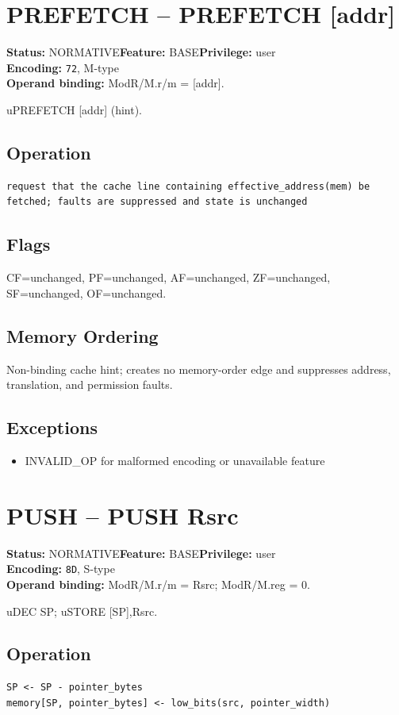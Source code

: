 \documentclass[10pt]{article}
\begin{document}
\section{PREFETCH -- PREFETCH [addr]}
\textbf{Status:} NORMATIVE\quad \textbf{Feature:} BASE\quad \textbf{Privilege:} user\\
\textbf{Encoding:} \texttt{72}, M-type\\
\textbf{Operand binding:} ModR/M.r/m = [addr].

uPREFETCH [addr] (hint).

\subsection*{Operation}
\begin{lstlisting}
request that the cache line containing effective_address(mem) be fetched; faults are suppressed and state is unchanged
\end{lstlisting}
\subsection*{Flags}
CF=unchanged, PF=unchanged, AF=unchanged, ZF=unchanged, SF=unchanged, OF=unchanged.
\subsection*{Memory Ordering}
Non-binding cache hint; creates no memory-order edge and suppresses address, translation, and permission faults.
\subsection*{Exceptions}
\begin{itemize}
\item INVALID\_OP for malformed encoding or unavailable feature
\end{itemize}
\clearpage

\section{PUSH -- PUSH Rsrc}
\textbf{Status:} NORMATIVE\quad \textbf{Feature:} BASE\quad \textbf{Privilege:} user\\
\textbf{Encoding:} \texttt{8D}, S-type\\
\textbf{Operand binding:} ModR/M.r/m = Rsrc; ModR/M.reg = 0.

uDEC SP; uSTORE [SP],Rsrc.

\subsection*{Operation}
\begin{lstlisting}
SP <- SP - pointer_bytes
memory[SP, pointer_bytes] <- low_bits(src, pointer_width)
\end{lstlisting}
\end{document}
